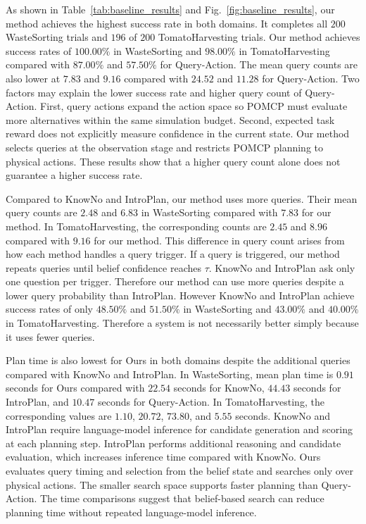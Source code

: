 As shown in Table~\ref{tab:baseline_results} and Fig.~\ref{fig:baseline_results}, our method achieves the highest success rate in both domains. It completes all $200$ WasteSorting trials and $196$ of $200$ TomatoHarvesting trials. Our method achieves success rates of $100.00\%$ in WasteSorting and $98.00\%$ in TomatoHarvesting compared with $87.00\%$ and $57.50\%$ for Query-Action. The mean query counts are also lower at $7.83$ and $9.16$ compared with $24.52$ and $11.28$ for Query-Action. Two factors may explain the lower success rate and higher query count of Query-Action. First, query actions expand the action space so POMCP must evaluate more alternatives within the same simulation budget. Second, expected task reward does not explicitly measure confidence in the current state. Our method selects queries at the observation stage and restricts POMCP planning to physical actions. These results show that a higher query count alone does not guarantee a higher success rate.

Compared to KnowNo and IntroPlan, our method uses more queries. Their mean query counts are $2.48$ and $6.83$ in WasteSorting compared with $7.83$ for our method. In TomatoHarvesting, the corresponding counts are $2.45$ and $8.96$ compared with $9.16$ for our method. This difference in query count arises from how each method handles a query trigger. If a query is triggered, our method repeats queries until belief confidence reaches $\tau$. KnowNo and IntroPlan ask only one question per trigger. Therefore our method can use more queries despite a lower query probability than IntroPlan. However KnowNo and IntroPlan achieve success rates of only $48.50\%$ and $51.50\%$ in WasteSorting and $43.00\%$ and $40.00\%$ in TomatoHarvesting. Therefore a system is not necessarily better simply because it uses fewer queries.

Plan time is also lowest for Ours in both domains despite the additional queries compared with KnowNo and IntroPlan. In WasteSorting, mean plan time is $0.91$ seconds for Ours compared with $22.54$ seconds for KnowNo, $44.43$ seconds for IntroPlan, and $10.47$ seconds for Query-Action. In TomatoHarvesting, the corresponding values are $1.10$, $20.72$, $73.80$, and $5.55$ seconds. KnowNo and IntroPlan require language-model inference for candidate generation and scoring at each planning step. IntroPlan performs additional reasoning and candidate evaluation, which increases inference time compared with KnowNo. Ours evaluates query timing and selection from the belief state and searches only over physical actions. The smaller search space supports faster planning than Query-Action. The time comparisons suggest that belief-based search can reduce planning time without repeated language-model inference. %


